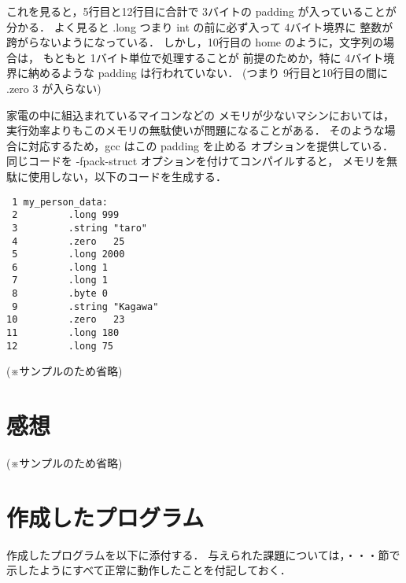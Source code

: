 \documentclass[a4j,11pt]{jarticle}
\begin{document}
これを見ると，5行目と12行目に合計で
3バイトの padding が入っていることが分かる．
よく見ると .long つまり int の前に必ず入って 4バイト境界に
整数が跨がらないようになっている．
しかし，10行目の home のように，文字列の場合は，
もともと 1バイト単位で処理することが
前提のためか，特に 4バイト境界に納めるような padding は行われていない．
(つまり 9行目と10行目の間に .zero 3 が入らない)

家電の中に組込まれているマイコンなどの
メモリが少ないマシンにおいては，
実行効率よりもこのメモリの無駄使いが問題になることがある．
そのような場合に対応するため，gcc はこの padding を止める
オプションを提供している．
同じコードを -fpack-struct オプションを付けてコンパイルすると，
メモリを無駄に使用しない，以下のコードを生成する．

{\fontsize{10pt}{11pt} \selectfont
\begin{verbatim}
 1 my_person_data:
 2         .long 999
 3         .string "taro"
 4         .zero   25
 5         .long 2000
 6         .long 1
 7         .long 1
 8         .byte 0
 9         .string "Kagawa"
10         .zero   23
11         .long 180
12         .long 75
\end{verbatim}
}

(※サンプルのため省略)

\section{感想}

(※サンプルのため省略)

\section{作成したプログラム}

作成したプログラムを以下に添付する．
与えられた課題については，・・・節で示したようにすべて正常に動作したことを付記しておく．
\end{document}
